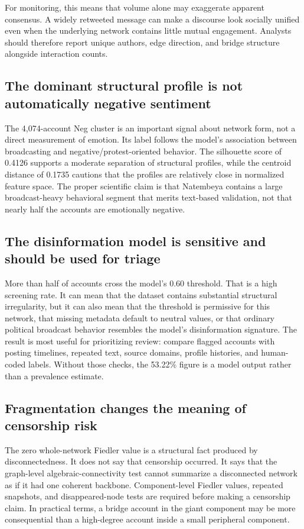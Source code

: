 \documentclass[11pt]{article}
\begin{document}
For monitoring, this means that volume alone may exaggerate apparent consensus. A widely retweeted message can make a discourse look socially unified even when the underlying network contains little mutual engagement. Analysts should therefore report unique authors, edge direction, and bridge structure alongside interaction counts.

\subsection{The dominant structural profile is not automatically negative sentiment}
The 4,074-account Neg cluster is an important signal about network form, not a direct measurement of emotion. Its label follows the model's association between broadcasting and negative/protest-oriented behavior. The silhouette score of 0.4126 supports a moderate separation of structural profiles, while the centroid distance of 0.1735 cautions that the profiles are relatively close in normalized feature space. The proper scientific claim is that Natembeya contains a large broadcast-heavy behavioral segment that merits text-based validation, not that nearly half the accounts are emotionally negative.

\subsection{The disinformation model is sensitive and should be used for triage}
More than half of accounts cross the model's 0.60 threshold. That is a high screening rate. It can mean that the dataset contains substantial structural irregularity, but it can also mean that the threshold is permissive for this network, that missing metadata default to neutral values, or that ordinary political broadcast behavior resembles the model's disinformation signature. The result is most useful for prioritizing review: compare flagged accounts with posting timelines, repeated text, source domains, profile histories, and human-coded labels. Without those checks, the 53.22\% figure is a model output rather than a prevalence estimate.

\subsection{Fragmentation changes the meaning of censorship risk}
The zero whole-network Fiedler value is a structural fact produced by disconnectedness. It does not say that censorship occurred. It says that the graph-level algebraic-connectivity test cannot summarize a disconnected network as if it had one coherent backbone. Component-level Fiedler values, repeated snapshots, and disappeared-node tests are required before making a censorship claim. In practical terms, a bridge account in the giant component may be more consequential than a high-degree account inside a small peripheral component.
\end{document}
